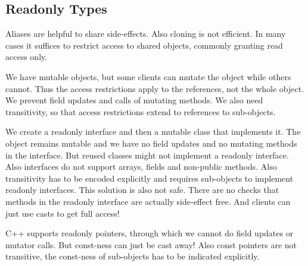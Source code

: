 \subsection{Readonly Types}
\begin{mytitle} Aliases are helpful to share side-effects. Also cloning is not efficient. In many cases it suffices to restrict access to shared objects, commonly granting read access only.
\end{mytitle}
\begin{mytitle} We have mutable objects, but some clients can mutate the object while others cannot. Thus the access restrictions apply to the references, not the whole object. We prevent field updates and calls of mutating methods. We also need transitivity, so that access restrictions extend to references to sub-objects.
\end{mytitle}
\begin{mytitle} We create a readonly interface and then a mutable class that implements it. The object remains mutable and we have no field updates and no mutating methods in the interface. But reused classes might not implement a readonly interface. Also interfaces do not support arrays, fields and non-public methods. Also transitivity has to be encoded explicitly and requires sub-objects to implement readonly interfaces. This solution is also not safe. There are no checks that methods in the readonly interface are actually side-effect free. And clients can just use casts to get full access!
\end{mytitle}
\begin{mytitle} C++ supports readonly pointers, through which we cannot do field updates or mutator calls. But const-ness can just be cast away! Also const pointers are not transitive, the const-ness of sub-objects has to be indicated explicitly.
\end{mytitle}
